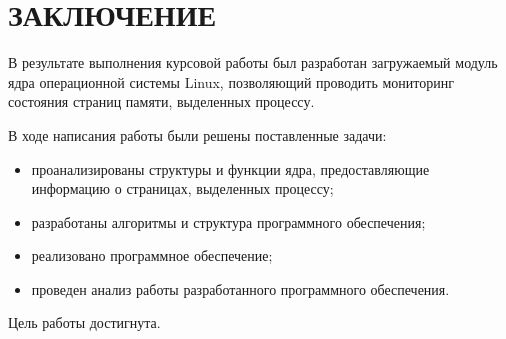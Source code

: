 \chapter*{ЗАКЛЮЧЕНИЕ}

В результате выполнения курсовой работы был разработан загружаемый модуль ядра операционной системы Linux, позволяющий проводить мониторинг состояния страниц памяти, выделенных процессу.

В ходе написания работы были решены поставленные задачи:
\begin{itemize}
	\item проанализированы структуры и функции ядра, предоставляющие информацию о страницах, выделенных процессу;
	\item разработаны алгоритмы и структура программного обеспечения;
	\item реализовано программное обеспечение;
	\item проведен анализ работы разработанного программного обеспечения.
\end{itemize}

Цель работы достигнута.